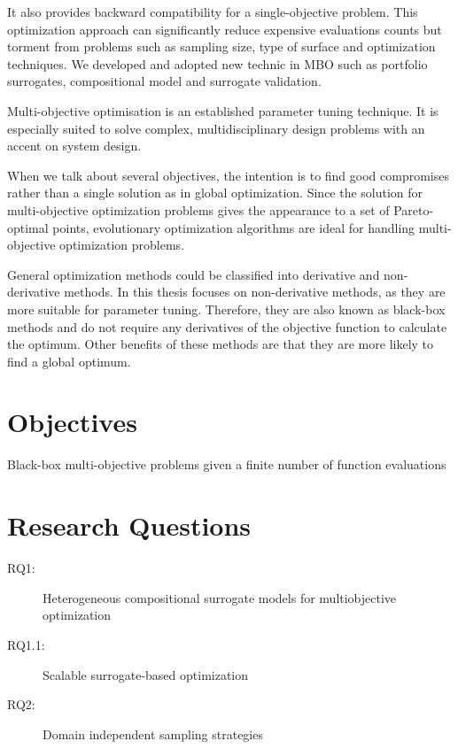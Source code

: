     It also provides backward compatibility for a single-objective problem. This optimization approach can significantly reduce expensive evaluations counts but torment from problems such as sampling size, type of surface and optimization techniques. We developed and adopted new technic in MBO such as portfolio surrogates, compositional model and surrogate validation. 

    Multi-objective optimisation is an established parameter tuning technique. It is especially suited to solve complex, multidisciplinary design problems with an accent on system design.

    When we talk about several objectives, the intention is to find good compromises rather than a single solution as in global optimization.
    Since the solution for multi-objective optimization problems gives the appearance to a set of Pareto-optimal points, evolutionary optimization algorithms are ideal for handling multi-objective optimization problems.

    General optimization methods could be classified into derivative and non-derivative methods. In this thesis focuses on non-derivative methods, as they are more suitable for parameter tuning. Therefore, they are also known as black-box methods and do not require any derivatives of the objective function to calculate the optimum.  Other benefits of these methods are that they are more likely to find a global optimum. 


\section{Objectives}
    Black-box multi-objective problems given a finite number of function evaluations

\section{Research Questions}


\begin{description}
    \item[RQ1:\label{RQ1}] Heterogeneous compositional surrogate models for multiobjective optimization
    \item[RQ1.1:\label{RQ1.1}] Scalable surrogate-based optimization 
    \item[RQ2:\label{RQ2}] Domain independent sampling strategies
\end{description}

